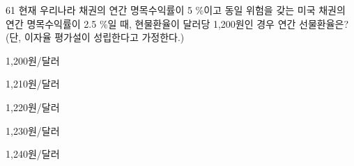 \begin{question}{61}
현재 우리나라 채권의 연간 명목수익률이 5 \%이고 동일 위험을 갖는 미국 채권의 연간 명목수익률이 2.5 \%일 때, 현물환율이 달러당 1,200원인 경우 연간 선물환율은? (단, 이자율 평가설이 성립한다고 가정한다.)
\begin{choices}
  \item 1,200원/달러
  \item 1,210원/달러
  \item 1,220원/달러
  \item 1,230원/달러
  \item 1,240원/달러
\end{choices}
\end{question}
